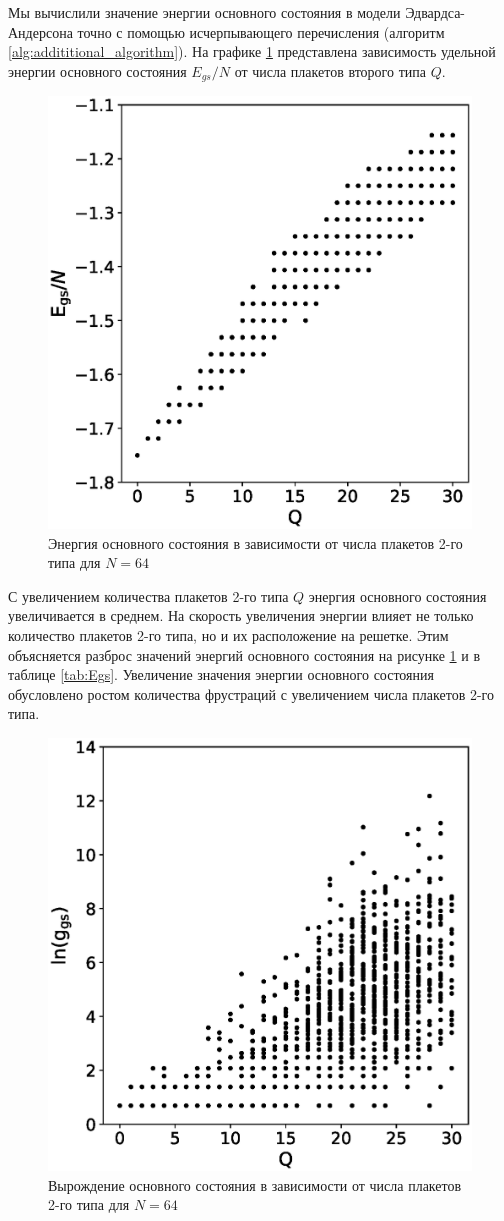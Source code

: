 \documentclass[utf8, babel, sor, jor, amsmath, amssymb, reprint]{elsarticle} %
\begin{document}
Мы вычислили значение энергии основного состояния в модели Эдвардса-Андерсона точно с помощью исчерпывающего перечисления (алгоритм \ref{alg:addititional_algorithm}). На графике \ref{fig:E(Q)} представлена зависимость удельной энергии основного состояния $E_{gs}/N$ от числа плакетов второго типа $Q$.

\begin{figure}[H]
	\centering
		\includegraphics[width=0.5\linewidth]{pictures/E_Q.eps}
	\caption{Энергия основного состояния в зависимости от числа плакетов 2-го типа для $N=64$}
	\label{fig:E(Q)}
\end{figure}

С увеличением количества плакетов 2-го типа $Q$ энергия основного состояния увеличивается в среднем. На скорость увеличения энергии влияет не только количество плакетов 2-го типа, но и их расположение на решетке. Этим объясняется разброс значений энергий основного состояния на рисунке \ref{fig:E(Q)} и в таблице \ref{tab:Egs}.
Увеличение значения энергии основного состояния обусловлено ростом количества фрустраций с увеличением числа плакетов 2-го типа.

\begin{figure}[H]
	\centering
	\includegraphics[width=0.5\linewidth]{pictures/g_Q.eps}
	\caption{Вырождение основного состояния в зависимости от числа плакетов 2-го типа для $N=64$}
	\label{fig:g(Q)}
\end{figure}
\end{document}
